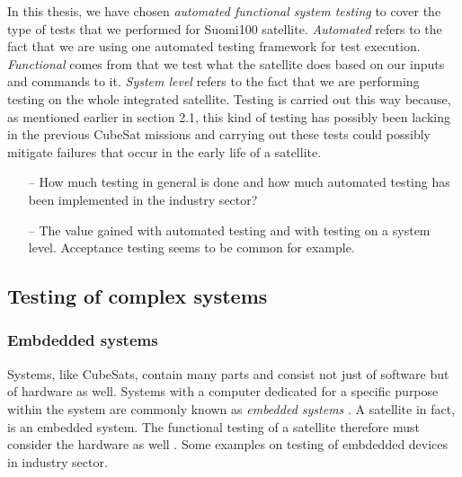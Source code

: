\documentclass[english,12pt,a4paper,pdftex,elec,utf8]{aaltothesis}
\begin{document}
\vspace{5mm}
In this thesis, we have chosen \textit{automated functional system testing} to cover the type of tests that we performed for Suomi100 satellite. \textit{Automated} refers to the fact that we are using one automated testing framework for test execution. \textit{Functional} comes from that we test what the satellite does based on our inputs and commands to it. \textit{System level} refers to the fact that we are performing testing on the whole integrated satellite. Testing is carried out this way because, as mentioned earlier in section 2.1, this kind of testing has possibly been lacking in the previous CubeSat missions and carrying out these tests could possibly mitigate failures that occur in the early life of a satellite.
\begin{itemize}
\item[--]How much testing in general is done and how much automated testing has been implemented in the industry sector?
\item[--]The value gained with automated testing and with testing on a system level. Acceptance testing seems to be common for example.
\end{itemize}
\subsection{Testing of complex systems}
\subsubsection{Embdedded systems}
Systems, like CubeSats, contain many parts and consist not just of software but of hardware as well. Systems with a computer dedicated for a specific purpose within the system are commonly known as \textit{embedded systems} \cite{sularikurssi}. A satellite in fact, is an embedded system. The functional testing of a satellite therefore must consider the hardware as well \cite{sularikurssi}.
Some examples on testing of embdedded devices in industry sector.\par 
\end{document}
